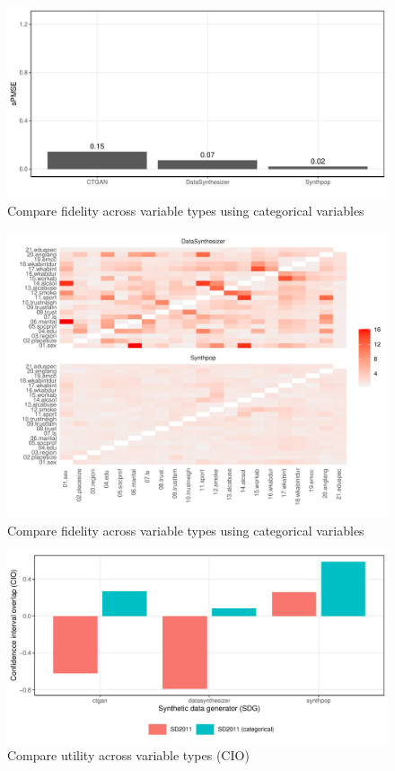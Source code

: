 \begin{figure}[ht]
  \caption{Compare fidelity across variable types using categorical variables}
  \label{fig:fidelity_compare_data}
  \centering
    \includegraphics[width=\linewidth]{../graphs/graph_fidelity_compare_dataset.pdf}
\end{figure}

\begin{figure}[ht]
  \caption{Compare fidelity across variable types using categorical variables}
  \label{fig:fidelity_compare_data_variables}
  \centering
    \includegraphics[width=\linewidth]{../graphs/graph_fidelity_compare_categorical_variables.pdf}
\end{figure}


\begin{figure}[ht]
  \caption{Compare utility across variable types (CIO)}
  \label{fig:utility_compare_cio}
  \centering
    \includegraphics[width=\linewidth]{../graphs/graph_utility_compare_dataset_regression_cio.pdf}
\end{figure}

